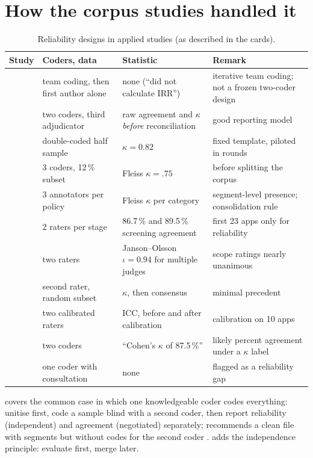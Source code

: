 \section{How the corpus studies handled it}
\begin{table}[t]
\centering\small
\caption{Reliability designs in applied studies (as described in the cards).}
\label{tab:I-practice}
\begin{tabularx}{\textwidth}{@{}P{2.6cm}P{3.2cm}YY@{}}
\toprule
\textbf{Study} & \textbf{Coders, data} & \textbf{Statistic} & \textbf{Remark}\\
\midrule
{} & team coding, then first author alone & none (``did not calculate IRR'') & iterative team coding; not a frozen two-coder design\\
 & two coders, third adjudicator & raw agreement and $\kappa$ \emph{before} reconciliation & good reporting model\\
 & double-coded half sample & $\kappa=0.82$ & fixed template, piloted in rounds\\
 & 3 coders, 12\,\% subset & Fleiss $\kappa=.75$ & before splitting the corpus\\
 & 3 annotators per policy & Fleiss $\kappa$ per category & segment-level presence; consolidation rule\\
 & 2 raters per stage & 86.7\,\% and 89.5\,\% screening agreement & first 23 apps only for reliability\\
 & two raters & Janson--Olsson $\iota=0.94$ for multiple judges & scope ratings nearly unanimous\\
 & second rater, random subset & $\kappa$, then consensus & minimal precedent\\
 & two calibrated raters & ICC, before and after calibration & calibration on 10 apps\\
 & two coders & ``Cohen's $\kappa$ of 87.5\,\%'' & likely percent agreement under a $\kappa$ label\\
 & one coder with consultation & none & flagged as a reliability gap\\
\bottomrule
\end{tabularx}
\end{table}
 covers the common case in which one knowledgeable coder codes everything: unitise first, code a sample blind with a second coder, then report reliability (independent) and agreement (negotiated) separately;  recommends a clean file with segments but without codes for the second coder .  adds the independence principle: evaluate first, merge later.


